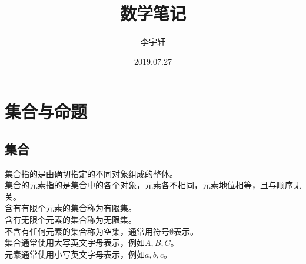 \documentclass[UTF8]{ctexart}
\title{数学笔记}
\author{李宇轩}
\date{2019.07.27}
\begin{document}

\maketitle

\newpage

\tableofcontents

\newpage

\setlength{\parindent}{0pt}

\section{集合与命题}

\subsection{集合}
    集合指的是由确切指定的不同对象组成的整体。\\[3mm]
    集合的元素指的是集合中的各个对象，元素各不相同，元素地位相等，且与顺序无关。\\[6mm]
    含有有限个元素的集合称为有限集。\\[3mm]
    含有无限个元素的集合称为无限集。\\[3mm]
    不含有任何元素的集合称为空集，通常用符号$\emptyset$表示。\\[6mm]
    集合通常使用大写英文字母表示，例如$A,B,C$。\\[3mm]
    元素通常使用小写英文字母表示，例如$a,b,c$。
\end{document}
